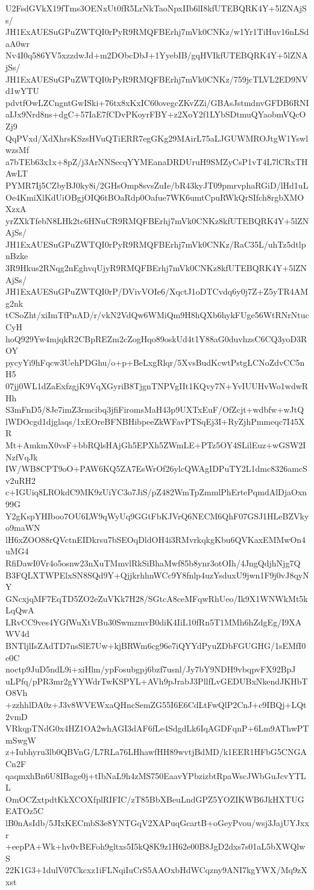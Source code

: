 U2FsdGVkX19fTms3OENxUt0fR5LrNkTaoNpxIIb6lI8kfUTEBQRK4Y+5lZNAjSs/
JH1ExAUESuGPuZWTQI0rPyR9RMQFBErhj7mVk0CNKz/w1Yr1TiHuv16nLSdaA0wr
Nv4I0q586YV5xzzdwJd+m2DObcDbJ+1YyebIB/gqHVIkfUTEBQRK4Y+5lZNAjSs/
JH1ExAUESuGPuZWTQI0rPyR9RMQFBErhj7mVk0CNKz/759jcTLVL2ED9NVd1wYTU
pdvtfOwLZCngntGwISki+76tx8xKxIC60ovegcZKvZZi/GBAsJstmdnvGFDB6RNI
aIJx9Nrd8ns+dgC+57IaE7fCDvPKoyrFBY+z2XoY2f1LYbSDtmuQYaobmVQcOZj9
QqPVxd/XdXhrsKSzsHVuQTiERR7egGKg29MAirL75aLJGUWMROJtgW1YswlwzsMf
a7bTEb63x1x+8pZ/j3ArNNSecqYYMEanaDRDUruH9SMZyCsP1vT4L7lCRxTHAwLT
PYMR7Ij5CZbyBJ0ky8i/2GHsOmp8svsZuIe/bR43kyJT09pmrvphaRGiD/lHd1uL
Oe4KmiXlKdUiOBgjOIQ6tBOaRdp0Oafue7WK6umtCpuRWkQrSIfch8rgbXMOXzxA
yrZXkTfebN8LHk2tc6HNuCR9RMQFBErhj7mVk0CNKz8kfUTEBQRK4Y+5lZNAjSs/
JH1ExAUESuGPuZWTQI0rPyR9RMQFBErhj7mVk0CNKz/RaC35L/uhTz5dtlpnBzke
3R9Hkus2RNqg2nEghvqUjyR9RMQFBErhj7mVk0CNKz8kfUTEBQRK4Y+5lZNAjSs/
JH1ExAUESuGPuZWTQI0rP/DVivVOIe6/XqctJ1oDTCvdq6y0j7Z+Z5yTR4AMg2nk
tCSoZht/xiImTfPnAD/r/vkN2VdQw6WMiQm9H8hQXb6hykFUge56WtRNrNtucCyH
hoQ929Yw4mjqkR2CBpREZm2cZogHqo89oskUd4t1Y88aG0duvhzsC6CQ3yoD3ROY
pycyYi9hFqcw3UehPDGhu/o+p+BeLxgRlqr/5XvsBudKcwtPstgLCNoZdvCC5nH5
07jj0WL1dZaExfzgjK9VqXGyriB8TjgnTNPVgIIt1KQvy7N+YvIUUHvWo1wdwRHh
S3mFnD5/8Je7imZ3rmcibq3jfiFiromsMaH43p9UXTxEuF/OfZcjt+wdbfw+wJtQ
lWDOcgd1djglaqs/1xEOreBFNBHibpeeZkWFavPTSqEj3I+RyZjhPmmeqc7I45XR
Mt+AmkmX0vsF+bbRQlsHAjGh5EPXh5ZWmLE+PTz5OY4SLilEuz+wGSW2INzfVqJk
IW/WB8CPT9oO+PAW6KQ5ZA7EsWrOf26ylcQWAgIDPuTY2L1dmc8326amcSv2uRH2
c+IGUiq8LROkdC9MK9zUiYC3o7JiS/pZ482WmTpZmmlPhErtePqmdAlDjaOxn99G
Y2gKspYHIboo7OU6LW9qWyUq9GGtFbKJVrQ6NECM6QhF07GSJ1HLeBZVkyo9maWN
lH6xZOO88rQVctnEIDkrsu7bSEOqDldOH4i3RMvrkqkgKbu6QVKaxEMMwOn4uMG4
RfiDawI0Vr4o5osnw23nXuTMmvlRkSiBhaMwf85b8ynr3otOIh/4JngQdjhNjg7Q
B3FQLXTWPElxSN8SQd9Y+QjjkrhhnWCc9Y8fnlp4uzYsduxU9jwn1F9j0vJ8qyNY
GNcxjqMF7EqTD5ZO2eZuVKk7H28/SGtcA8ceMFqwRhUeo/Ik9X1WNWkMt5kLqQwA
LRvCC9ves4YGfWuXtVBu30SwmzmvB0diK4IiL10fRn5T1MMh6hZdgEg/I9XAWV4d
BNTljlIsZAdTD7nsSlE7Uw+kjBRWm6cg96e7iQYYdPyuZDbFGUGHG/1sEMfI0e0C
noctp9JuD5ndL9i+xiHlm/ypFosubgpj6bzf7usnl/Jy7bY9NDH9vbqpvFX92BpJ
uLPfq/pPR3mr2gYYWdrTwKSPYL+AVh9pJrabJ3PllfLvGEDUBxNkendJKHbTO8Vh
+zzhhlDA0z+J3v8WVEWxaQHncSemZG55I6E6CdLtFwQlP2CnJ+c9IBQj+LQt2vmD
VRkqpTNdG0x4HZ1OA2whAGI3dAF6fLe4SdgdLk6IqAGDFqnP+6Lm9AThwPTmSwgW
z+Iubhyru3lb0QBVnG/L7RLa76LHhawfHH89wvtjBdMD/k1EER1HFbG5CNGACn2F
qaqmxhBn6U8IBage0j+tIbNaL9h4zMS750EaavYPbzizbtRpaWscJWbGuJcvYTLL
OmOCZxtpdtKkXCOXfplRIFIC/zT85BbXBeuLndGPZ5YOZIKWB6JkHXTUGEATOz5C
lB0nAsIdb/5JIxKECmbS3e8YNTGqV2XAPuqGcartB+oGeyPvou/wsj3JajUYJxxr
+eepPA+Wk+hv0vBEFoh9gltxs5I5kQ8K9z1H62e00B8JgD2dxs7s01aL5bXWQlwS
22K1G3+1dulV07Ckcxz1iFLNqiIuCrS5AAOxbHdWCqzny9ANI7kgYWX/Mq9zXxst
